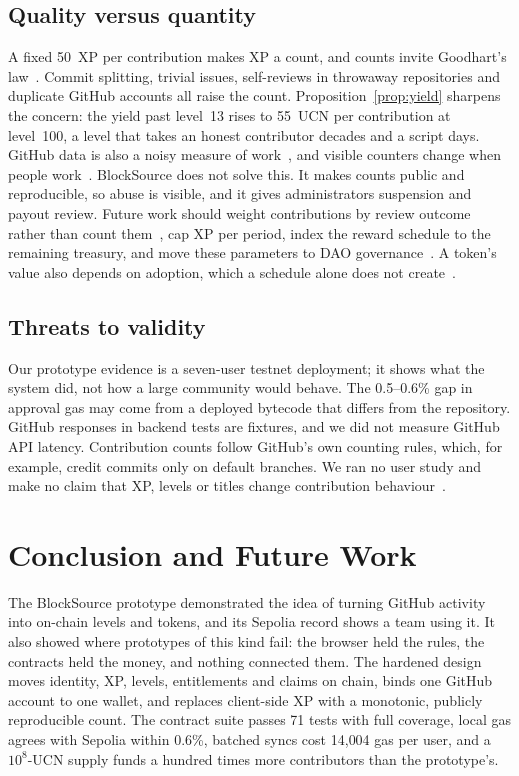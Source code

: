 \documentclass[conference]{IEEEtran}
\begin{document}
\subsection{Quality versus quantity}\label{sec:gaming}
A fixed 50~XP per contribution makes XP a count, and counts invite Goodhart's law~\cite{strathern1997goodhart}. Commit splitting, trivial issues, self-reviews in throwaway repositories and duplicate GitHub accounts all raise the count. Proposition~\ref{prop:yield} sharpens the concern: the yield past level~13 rises to 55~UCN per contribution at level~100, a level that takes an honest contributor decades and a script days. GitHub data is also a noisy measure of work~\cite{kalliamvakou2014perils}, and visible counters change when people work~\cite{moldon2021gamification}. BlockSource does not solve this. It makes counts public and reproducible, so abuse is visible, and it gives administrators suspension and payout review. Future work should weight contributions by review outcome rather than count them~\cite{bacchelli2013review,gousios2014pull}, cap XP per period, index the reward schedule to the remaining treasury, and move these parameters to DAO governance~\cite{hassan2021dao,wang2019dao}. A token's value also depends on adoption, which a schedule alone does not create~\cite{cong2021tokenomics}.

\subsection{Threats to validity}
Our prototype evidence is a seven-user testnet deployment; it shows what the system did, not how a large community would behave. The 0.5--0.6\% gap in approval gas may come from a deployed bytecode that differs from the repository. GitHub responses in backend tests are fixtures, and we did not measure GitHub API latency. Contribution counts follow GitHub's own counting rules, which, for example, credit commits only on default branches. We ran no user study and make no claim that XP, levels or titles change contribution behaviour~\cite{hamari2014gamification,anderson2013badges}.

\section{Conclusion and Future Work}\label{sec:conclusion}
The BlockSource prototype demonstrated the idea of turning GitHub activity into on-chain levels and tokens, and its Sepolia record shows a team using it. It also showed where prototypes of this kind fail: the browser held the rules, the contracts held the money, and nothing connected them. The hardened design moves identity, XP, levels, entitlements and claims on chain, binds one GitHub account to one wallet, and replaces client-side XP with a monotonic, publicly reproducible count. The contract suite passes 71 tests with full coverage, local gas agrees with Sepolia within 0.6\%, batched syncs cost 14{,}004 gas per user, and a $10^{8}$-UCN supply funds a hundred times more contributors than the prototype's.
\end{document}
